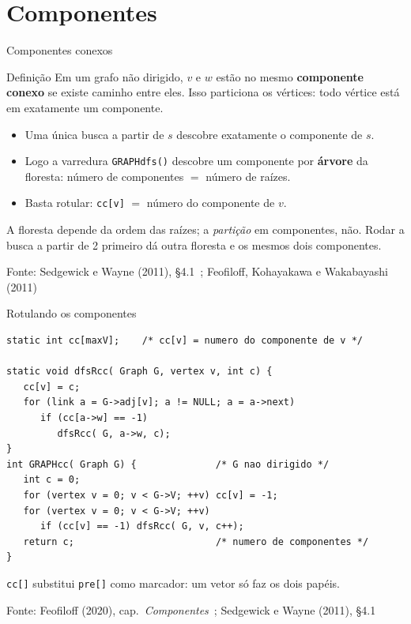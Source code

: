 \documentclass[aspectratio=169]{beamer}
\newcommand{\fonte}[1]{\vfill{\tiny\color{gray!60!black}Fonte: #1\par}}
\begin{document}
\section{Componentes}

\begin{frame}{Componentes conexos}
  \begin{block}{Definição}
    {\small Em um grafo não dirigido, $v$ e $w$ estão no mesmo
    \textbf{componente conexo} se existe caminho entre eles. Isso particiona os
    vértices: todo vértice está em exatamente um componente.}
  \end{block}
  {\small
  \begin{itemize}\small
    \item Uma única busca a partir de $s$ descobre exatamente o componente de $s$.
    \item Logo a varredura \texttt{GRAPHdfs()} descobre um componente por
          \textbf{árvore} da floresta: número de componentes $=$ número de raízes.
    \item Basta rotular: \texttt{cc[v]} $=$ número do componente de $v$.
  \end{itemize}}
  {\scriptsize A floresta depende da ordem das raízes; a \emph{partição} em
  componentes, não. Rodar a busca a partir de 2 primeiro dá outra floresta e os
  mesmos dois componentes.}
  \fonte{Sedgewick e Wayne (2011), \S 4.1~\cite{sedgewick2011algorithms}; Feofiloff, Kohayakawa e Wakabayashi (2011)~\cite{feofiloff2011teoriagrafos}}
\end{frame}

\begin{frame}[fragile]{Rotulando os componentes}
\begin{lstlisting}
static int cc[maxV];    /* cc[v] = numero do componente de v */

static void dfsRcc( Graph G, vertex v, int c) {
   cc[v] = c;
   for (link a = G->adj[v]; a != NULL; a = a->next)
      if (cc[a->w] == -1)
         dfsRcc( G, a->w, c);
}
int GRAPHcc( Graph G) {              /* G nao dirigido */
   int c = 0;
   for (vertex v = 0; v < G->V; ++v) cc[v] = -1;
   for (vertex v = 0; v < G->V; ++v)
      if (cc[v] == -1) dfsRcc( G, v, c++);
   return c;                         /* numero de componentes */
}
\end{lstlisting}
  {\scriptsize \texttt{cc[]} substitui \texttt{pre[]} como marcador: um vetor só
  faz os dois papéis.}
  \fonte{Feofiloff (2020), cap.\ \emph{Componentes}~\cite{feofiloff2020algoritmos}; Sedgewick e Wayne (2011), \S 4.1~\cite{sedgewick2011algorithms}}
\end{frame}
\end{document}
